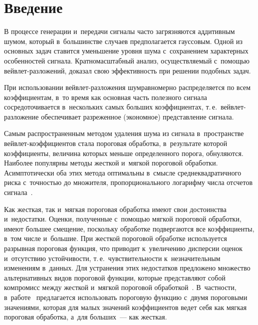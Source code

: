 
  



\thispagestyle{headings}

\begin{multicols}{2}

\label{st\stat}

\section{Введение}

В процессе генерации и~передачи сигналы часто загрязняются аддитивным 
шумом, который в~большинстве случаев предполагается гауссовым. Одной из основных 
задач ставится уменьшение уровня шума с~сохранением характерных особенностей 
сигнала. Кратномасштабный анализ, осуществляемый с~по\-мощью вейв\-лет-раз\-ло\-же\-ний, 
доказал свою эффективность при решении подобных задач. 

При использовании 
вейвлет-разложения шум\linebreak равномерно распределяется по всем коэффициентам, в~то 
время как основная часть полезного сигнала сосредоточивается в~нескольких самых 
больших коэффициентах, т.\,е.\ вейв\-лет-раз\-ло\-же\-ние обеспечива\-ет разреженное 
(экономное) пред\-став\-ле\-ние сигнала. 

Самым распространенным методом удаления шума 
из сигнала в~пространстве вейв\-лет-ко\-эф\-фи\-ци\-ен\-тов стала пороговая обработка, 
в~результате которой коэффициенты, величина которых меньше определенного порога, 
обнуляются. Наиболее популярны методы жесткой и~мягкой пороговой обработки. 
Асимптотически оба этих метода оптимальны в~смыс\-ле среднеквадратичного риска 
с~точ\-ностью до множителя, пропорционального логарифму числа отсчетов сигнала~\cite{DonJ94}. 

Как жест\-кая, так и~мягкая пороговая обработка имеют свои 
достоинства и~недостатки. Оценки, полученные с~помощью мягкой пороговой 
обработки, имеют большее смещение, поскольку обработке подвергаются все 
коэффициенты, в~том числе и~большие. При жесткой пороговой обработке 
используется разрывная пороговая функция, что приводит к~увеличению дисперсии 
оценок и~отсутствию устойчивости, т.\,е.\ чувствительности к~незначительным 
изменениям в~данных. 
Для устранения этих недостатков предложено множество 
альтернативных видов пороговой функции, которые представляют собой компромисс 
между жесткой и~мягкой пороговой обработкой~\cite{BG97,G98, CK05, PK05, LC10, HL10, ZC15, HX15, PR16, HT18}. 
В~част\-ности, в~работе~\cite{BG97} предлагается 
использовать пороговую функцию с~двумя пороговыми значениями, которая для малых 
значений коэффициентов ведет себя как мягкая пороговая обработка, а~для больших~--- как жесткая. 


\end{multicols}
